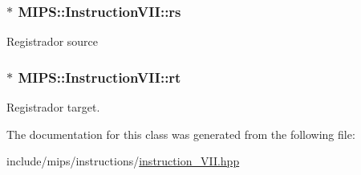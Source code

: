 \subsubsection[{\texorpdfstring{rs}{rs}}]{$\ast$ M\+I\+P\+S\+::\+Instruction\+V\+I\+I\+::rs\hspace{0.3cm}{\ttfamily [protected]}}\hypertarget{classMIPS_1_1InstructionVII_a8e51202e0b22f8e74668f6de95089e60}{}\label{classMIPS_1_1InstructionVII_a8e51202e0b22f8e74668f6de95089e60}
Registrador source 
\subsubsection[{\texorpdfstring{rt}{rt}}]{$\ast$ M\+I\+P\+S\+::\+Instruction\+V\+I\+I\+::rt\hspace{0.3cm}{\ttfamily [protected]}}\hypertarget{classMIPS_1_1InstructionVII_a8710c06b6e7816f330b0c5daea3402a4}{}\label{classMIPS_1_1InstructionVII_a8710c06b6e7816f330b0c5daea3402a4}
Registrador target. 

The documentation for this class was generated from the following file\+:\begin{DoxyCompactItemize}
\item 
include/mips/instructions/\hyperlink{instruction__VII_8hpp}{instruction\+\_\+\+V\+I\+I.\+hpp}\end{DoxyCompactItemize}
